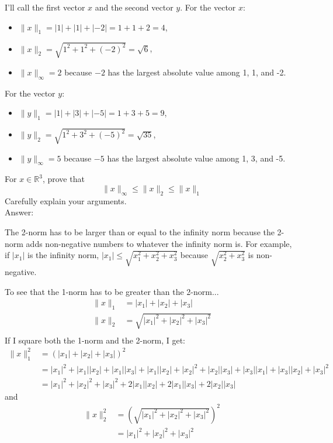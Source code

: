 \documentclass[11pt]{amsart}
\begin{document}
{\begin{enumerate}
{I'll call the first vector $x$ and the second vector $y$. For the vector $x$: \\
\begin{itemize}
\item $\|x\|_1 = |1| + |1| + |-2| = 1 + 1 + 2 = 4$, 
\item $\|x\|_2 = \sqrt{1^2 + 1^2 + (-2)^2} = \sqrt{6}$, 
\item $\|x\|_\infty = 2$ because $-2$ has the largest absolute value among 1, 1, and -2. \\
\end{itemize} 

For the vector $y$:
\begin{itemize}
\item $\|y\|_1 = |1| + |3| + |-5| = 1 + 3 + 5 = 9$, 
\item $\|y\|_2 = \sqrt{1^2 + 3^2 + (-5)^2} = \sqrt{35}$, 
\item $\|y\|_\infty = 5$ because $-5$ has the largest absolute value among 1, 3, and -5. 
\end{itemize}
 

\bigskip

\item[Problem 6:] For $x\in \mathbb{R}^3$, prove that 
\[
\|x\|_\infty \leq \|x\|_2 \leq \|x\|_1
\]
Carefully explain your arguments. \\
Answer: 

The 2-norm has to be larger than or equal to the infinity norm because the 2-norm adds non-negative numbers 
to whatever the infinity norm is. For example, if $|x_1|$ is the infinity norm, 
$|x_1| \leq \sqrt{x_1^2 + x_2^2 + x_3^2}$ because $\sqrt{x_2^2 + x_3^2}$ is non-negative.

To see that the 1-norm has to be greater than the 2-norm... 
\begin{align} \nonumber
\|x\|_1 &= |x_1| + |x_2| + |x_3| \\ \nonumber
\|x\|_2 &= \sqrt{|x_1|^2 + |x_2|^2 + |x_3|^2} \\ \nonumber
\end{align}
If I square both the 1-norm and the 2-norm, I get: 
\begin{align} \nonumber
\|x\|_1^2 &= (|x_1| + |x_2| + |x_3|)^2 \\ \nonumber
              &= |x_1|^2 + |x_1||x_2| + |x_1||x_3| + |x_1||x_2| + |x_2|^2 + |x_2||x_3| + |x_3||x_1| + |x_3||x_2| + |x_3|^2 \\ \nonumber
              &= |x_1|^2 + |x_2|^2 + |x_3|^2 + 2|x_1||x_2| + 2|x_1||x_3| + 2|x_2||x_3|
\end{align}
and
\begin{align} \nonumber
\|x\|_2^2 &= (\sqrt{|x_1|^2 + |x_2|^2 + |x_3|^2})^2 \\ \nonumber
              &= |x_1|^2 + |x_2|^2 + |x_3|^2
\end{align}

}
\end{enumerate}}
\end{document}
